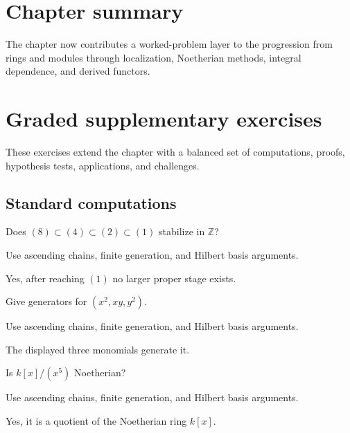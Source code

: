 \section*{Chapter summary}
The chapter now contributes a worked-problem layer to the progression from rings and modules through localization, Noetherian methods, integral dependence, and derived functors.
\section{Graded supplementary exercises}
These exercises extend the chapter with a balanced set of computations, proofs, hypothesis tests, applications, and challenges.

\subsection*{Standard computations}

\begin{exercise}\label{exr:v15-expand-01}
Does $(8)\subset(4)\subset(2)\subset(1)$ stabilize in $\mathbb Z$?
\end{exercise}
\begin{hint}
Use ascending chains, finite generation, and Hilbert basis arguments.
\end{hint}
\begin{solution}
Yes, after reaching $(1)$ no larger proper stage exists.
\end{solution}

\begin{exercise}\label{exr:v15-expand-02}
Give generators for $(x^2,xy,y^2)$.
\end{exercise}
\begin{hint}
Use ascending chains, finite generation, and Hilbert basis arguments.
\end{hint}
\begin{solution}
The displayed three monomials generate it.
\end{solution}

\begin{exercise}[Quotient]\label{exr:v15-expand-03}
Is $k[x]/(x^5)$ Noetherian?
\end{exercise}
\begin{hint}
Use ascending chains, finite generation, and Hilbert basis arguments.
\end{hint}
\begin{solution}
Yes, it is a quotient of the Noetherian ring $k[x]$.
\end{solution}

